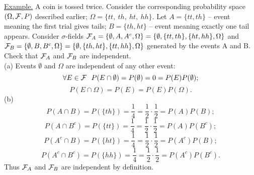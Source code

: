 \documentclass[a4paper,10pt]{article}
\newcommand{\1}[1]{\mathbf{1}_{\{#1\}}}
\begin{document}
\underline{Example.} A coin is tossed twice. Consider the corresponding probability space $(\Omega,{\cal F},P)$ described earlier; $\Omega=\{tt,~th,~ht,~hh\}$. Let $A=\{tt,th\}$ -- event meaning the first trial gives tails; $B=\{th,ht\}$ -- event meaning exactly one tail appears. Consider $\sigma$-fields ${\cal F}_A=\{\emptyset, A,A^c,\Omega\}=\{\emptyset, \{tt,th\},\{ht,hh\},\Omega\}$ and ${\cal F}_B=\{\emptyset, B,B^c,\Omega\}=\{\emptyset, \{th,ht\},\{tt,hh\},\Omega\}$ generated by the events A and B. Check that ${\cal F}_A$ and ${\cal F}_B$ are independent.\\
(a) Events $\emptyset$ and $\Omega$ are independent of any other event:
  $$\forall E\in{\cal F}~~P(E\cap\emptyset)=P(\emptyset)=0=P(E)P(\emptyset);$$
  $$P(E\cap\Omega)=P(E)=P(E)P(\Omega).$$
(b)
  $$P(A\cap B)=P(\{th\})=\frac{1}{4}=\frac{1}{2}\cdot\frac{1}{2}=P(A)P(B);$$
  $$P(A\cap B^c)=P(\{tt\})=\frac{1}{4}=\frac{1}{2}\cdot\frac{1}{2}=P(A)P(B^c);$$
  $$P(A^c\cap B)=P(\{ht\})=\frac{1}{4}=\frac{1}{2}\cdot\frac{1}{2}=P(A^c)P(B);$$
  $$P(A^c\cap B^c)=P(\{hh\})=\frac{1}{4}=\frac{1}{2}\cdot\frac{1}{2}=P(A^c)P(B^c).$$
Thus ${\cal F}_A$ and ${\cal F}_B$ are independent by definition.
\end{document}

